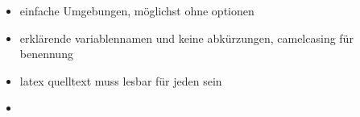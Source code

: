 \documentclass[a4paper, fleqn, 10pt]{article}
\begin{document}
  \begin{itemize}
    \item einfache Umgebungen, möglichst ohne optionen
    \item erklärende variablennamen und keine abkürzungen, camelcasing für benennung
    \item latex quelltext muss lesbar für jeden sein
    \item
  \end{itemize}
\end{document}
